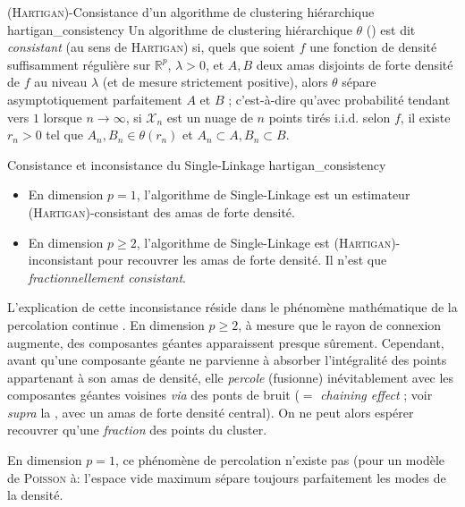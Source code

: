 \begin{Definition}{(\textsc{Hartigan})-Consistance d'un algorithme de clustering hiérarchique \cite{hartigan81}}{hartigan_consistency}
Un algorithme de clustering hiérarchique $\theta$ () est dit \emph{consistant} (au sens de \textsc{Hartigan}) si, quels que soient $f$ une fonction de densité suffisamment régulière sur $\mathbb R^p$,  $\lambda > 0$, et $A,B$ deux amas disjoints de forte densité de $f$ au niveau $\lambda$ (et de mesure strictement positive), alors $\theta$ sépare asymptotiquement parfaitement $A$ et $B$ ;  c'est-à-dire qu'avec probabilité tendant vers $1$ lorsque $n\to \infty$, si $\mathcal X_n$ est un nuage de $n$ points tirés i.i.d. selon $f$, il existe $r_n > 0$ tel que $A_n, B_n \in \theta(r_n)$ et $A_n \subset A, B_n \subset B $.
\end{Definition}

\begin{Resultat}{Consistance et inconsistance du Single-Linkage \cite{hartigan81}}{hartigan_consistency}
\begin{itemize}
    \item En dimension $p=1$, l'algorithme de Single-Linkage est un estimateur (\textsc{Hartigan})-{consistant} des amas de forte densité.
    \item En dimension $p \ge 2$, l'algorithme de Single-Linkage est (\textsc{Hartigan})-{inconsistant} pour recouvrer les amas de forte densité. Il n'est que \emph{fractionnellement consistant}.
\end{itemize}
\end{Resultat}

L'explication de cette inconsistance réside dans le phénomène mathématique de {la percolation continue} \cite{MeesterRoy, penrose2003}. En dimension $p \ge 2$, à mesure que le rayon de connexion augmente, des composantes géantes apparaissent presque sûrement. Cependant, avant qu'une composante géante ne parvienne à absorber l'intégralité des points appartenant à son amas de densité, elle \emph{percole} (fusionne) inévitablement avec les composantes géantes voisines \emph{via} des ponts de bruit ($=$ \emph{chaining effect} ; voir \emph{supra} la , avec un amas de forte densité central). On ne peut alors espérer recouvrer qu'une \emph{fraction} des points du cluster. 


En dimension $p=1$, ce phénomène de percolation n'existe pas (pour un modèle de \textsc{Poisson} à: l'espace vide maximum sépare toujours parfaitement les modes de la densité.



